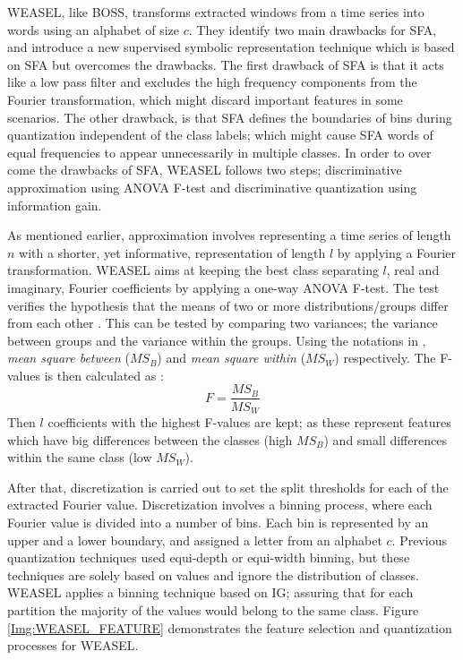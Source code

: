 WEASEL, like BOSS, transforms extracted windows from a time series into words using an alphabet of size $c$.
They identify two main drawbacks for SFA, and introduce a new supervised symbolic representation technique which is based on SFA but overcomes the drawbacks.
The first drawback of SFA is that it acts like a low pass filter and excludes the high frequency components from the Fourier transformation,
which might discard important features in some scenarios. The other drawback, is that SFA defines the boundaries of bins during quantization
independent of the class labels; which might cause SFA words of equal frequencies to appear unnecessarily in multiple classes.
In order to over come the drawbacks of SFA, WEASEL follows two steps;
discriminative approximation using ANOVA F-test and discriminative quantization using information gain.

As mentioned earlier, approximation involves representing a time series of length $n$ with a shorter, yet informative, representation of length $l$ by applying a Fourier transformation.
WEASEL aims at keeping the best class separating $l$, real and imaginary, Fourier coefficients by applying a one-way ANOVA F-test.
The test verifies the hypothesis that the means of two or more distributions/groups differ from each other \cite{lowry2014concepts}.
This can be tested by comparing two variances; the variance between groups and the variance within the groups.
Using the notations in \cite{schafer2017fast}, \emph{mean square between} ($MS_{B}$) and \emph{mean square within} ($MS_{W}$) respectively.
The F-values is then calculated as :
\begin{equation}
    F= \frac{MS_{B}}{MS_{W}}
\end{equation}
Then $l$ coefficients with the highest F-values are kept; as these represent features which have big differences between the classes (high $MS_{B}$) and
small differences within the same class (low $MS_{W}$).

After that, discretization is carried out to set the split thresholds for each of the extracted Fourier value.
Discretization involves a binning process, where each Fourier value is divided into a number of bins.
Each bin is represented by an upper and a lower boundary, and assigned a letter from an alphabet $c$.
Previous quantization techniques used equi-depth or equi-width binning, but these techniques are solely based on values and ignore the distribution of classes.
WEASEL applies a binning technique based on IG; assuring that for each partition the majority of the values would belong to the same class.
Figure \ref{Img:WEASEL_FEATURE} demonstrates the feature selection and quantization processes for WEASEL.

